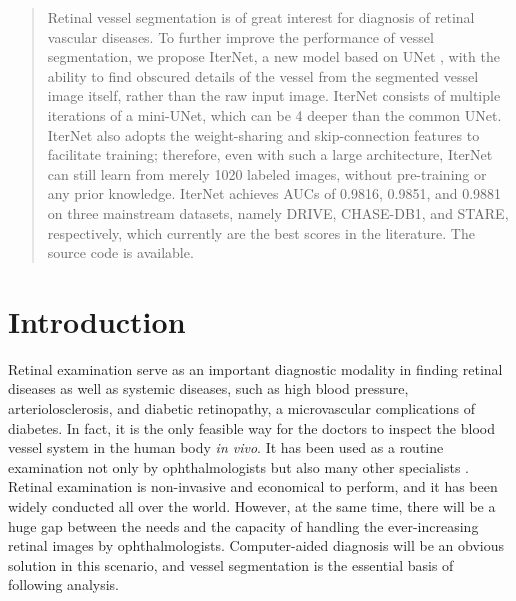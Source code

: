 \documentclass[10pt,twocolumn,letterpaper]{article}
\begin{document}
	\maketitle
	\thispagestyle{plain}


\begin{abstract}
	\vspace{-3.5mm}
 Retinal vessel segmentation is of great interest for diagnosis of retinal vascular diseases. To further improve the performance of vessel segmentation, we propose IterNet, a new model based on UNet \cite{UNet}, with the ability to find obscured details of the vessel from the segmented vessel image itself, rather than the raw input image. IterNet consists of multiple iterations of a mini-UNet, which can be 4 deeper than the common UNet. IterNet also adopts the weight-sharing and skip-connection features to facilitate training; therefore, even with such a large architecture, IterNet can still learn from merely 1020 labeled images, without pre-training or any prior knowledge. IterNet achieves AUCs of 0.9816, 0.9851, and 0.9881 on three mainstream datasets, namely DRIVE, CHASE-DB1, and STARE, respectively, which currently are the best scores in the literature.
The source code is available\footnotemark.
\vspace{-5mm}
\end{abstract}



\section{Introduction}\label{section_intro}
Retinal examination serve as an important diagnostic modality in finding retinal diseases as well as systemic diseases, such as high blood pressure, arteriolosclerosis, and diabetic retinopathy, a microvascular complications of diabetes. In fact, it is the only feasible way for the doctors to inspect the blood vessel system in the human body \textit{in vivo}. It has been used as a routine examination not only by ophthalmologists but also many other specialists \cite{chatziralli2012value}.
Retinal examination is non-invasive and economical to perform, and it has been widely conducted all over the world. However, at the same time, there will be a huge gap between the needs and the capacity of handling the ever-increasing retinal images by ophthalmologists. Computer-aided diagnosis will be an obvious solution in this scenario, and vessel segmentation is the essential basis of following analysis.
\end{document}
